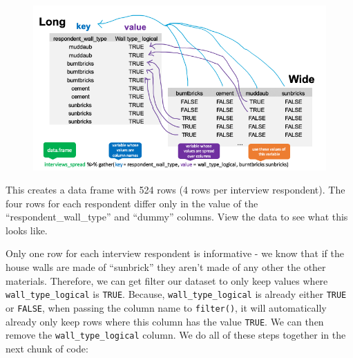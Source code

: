 \documentclass[]{book}
\newenvironment{Shaded}{\begin{snugshade}}{\end{snugshade}}
\newcommand{\KeywordTok}[1]{\textcolor[rgb]{0.13,0.29,0.53}{\textbf{#1}}}
\newcommand{\DataTypeTok}[1]{\textcolor[rgb]{0.13,0.29,0.53}{#1}}
\newcommand{\StringTok}[1]{\textcolor[rgb]{0.31,0.60,0.02}{#1}}
\newcommand{\OperatorTok}[1]{\textcolor[rgb]{0.81,0.36,0.00}{\textbf{#1}}}
\newcommand{\NormalTok}[1]{#1}
\begin{document}
\begin{Shaded}
\end{Shaded}

\begin{figure}
\centering
\includegraphics{../fig/wide_to_long.png}
\caption{}
\end{figure}

This creates a data frame with 524 rows (4 rows per interview
respondent). The four rows for each respondent differ only in the value
of the ``respondent\_wall\_type'' and ``dummy'' columns. View the data
to see what this looks like.

Only one row for each interview respondent is informative - we know that
if the house walls are made of ``sunbrick'' they aren't made of any
other the other materials. Therefore, we can get filter our dataset to
only keep values where \texttt{wall\_type\_logical} is \texttt{TRUE}.
Because, \texttt{wall\_type\_logical} is already either \texttt{TRUE} or
\texttt{FALSE}, when passing the column name to \texttt{filter()}, it
will automatically already only keep rows where this column has the
value \texttt{TRUE}. We can then remove the \texttt{wall\_type\_logical}
column. We do all of these steps together in the next chunk of code:

\begin{Shaded}
\end{Shaded}
\end{document}
